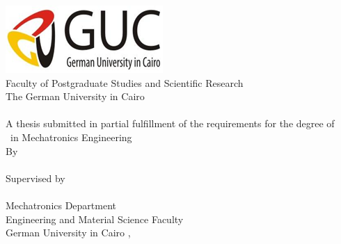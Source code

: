 \pagestyle{plain}
\let\cleardoublepage\relax
\newpage
\thispagestyle{empty}
\begin{center}
	\includegraphics[]{Figures/GUC_logo.png} \\
	\vspace{0.5cm}
    {Faculty of Postgraduate Studies and Scientific Research\\
	The German University in Cairo\\}
    \vspace{1cm}
	\huge \textbf {\titleOfThesisOne\\}
	\vspace{1cm}
	\large {A thesis submitted in partial fulfillment of the requirements for the degree of\\ \typeOfThesis\ in Mechatronics Engineering\\} 
	\vspace{0.5cm}
	{By\\}
	\Large \textbf{\authorOfThesis}\\
	\singlespacing
	{Supervised by\\}
	\large \textbf{\supervisorOne\\}
	\vspace{0.5cm}
	{Mechatronics Department\\
	Engineering and Material Science Faculty\\
	German University in Cairo}
	\singlespacing
	\vspace{1cm}
	{\submissionMonth, \submissionYear}
\end{center}
\clearpage
\setcounter{page}{1}
\thispagestyle{empty}\ \clearpage